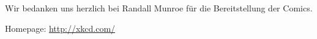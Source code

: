 Wir bedanken uns herzlich bei Randall Munroe für die Bereitstellung der Comics.

\medskip Homepage: \url{http://xkcd.com/}
